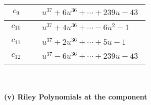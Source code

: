 \documentclass[1p]{elsarticle_modified}
\theoremstyle{definition}
\begin{document}
\begin{tabular}{m{50pt}|m{274pt}}
\hline $$\begin{aligned}c_{9}\end{aligned}$$&$\begin{aligned}
&u^{37}+6 u^{36}+\cdots+239 u+43
\end{aligned}$\\
\hline $$\begin{aligned}c_{10}\end{aligned}$$&$\begin{aligned}
&u^{37}+4 u^{36}+\cdots-6 u^2-1
\end{aligned}$\\
\hline $$\begin{aligned}c_{11}\end{aligned}$$&$\begin{aligned}
&u^{37}+2 u^{36}+\cdots+5 u-1
\end{aligned}$\\
\hline $$\begin{aligned}c_{12}\end{aligned}$$&$\begin{aligned}
&u^{37}-6 u^{36}+\cdots+239 u-43
\end{aligned}$\\
\hline
\end{tabular}\\~\\
\newpage\renewcommand{\arraystretch}{1}
\flushleft \textbf{(v) Riley Polynomials at the component}\newline \\
\end{document}
